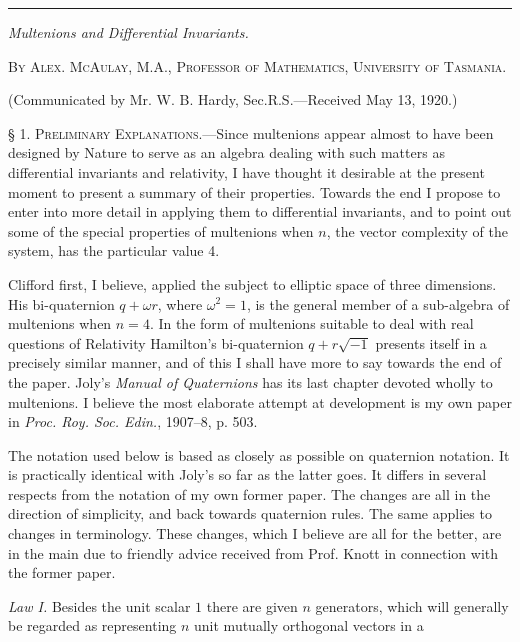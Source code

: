 \documentclass[11pt]{article}
\begin{document}
\thispagestyle{empty}

\begin{center}\rule{0.34\textwidth}{0.5pt}\end{center}
\begin{center}\textit{Multenions and Differential Invariants.}\end{center}
\begin{center}\textsc{By Alex. McAulay, M.A., Professor of Mathematics, University of Tasmania.}\end{center}
\begin{center}(Communicated by Mr. W. B. Hardy, Sec.R.S.---Received May 13, 1920.)\end{center}

\noindent\textsc{§ 1. Preliminary Explanations.}---Since multenions appear almost to have been designed by Nature to serve as an algebra dealing with such matters as differential invariants and relativity, I have thought it desirable at the present moment to present a summary of their properties. Towards the end I propose to enter into more detail in applying them to differential invariants, and to point out some of the special properties of multenions when $n$, the vector complexity of the system, has the particular value 4.

\indent Clifford first, I believe, applied the subject to elliptic space of three dimensions. His bi-quaternion $q+\omega r$, where $\omega^2=1$, is the general member of a sub-algebra of multenions when $n=4$. In the form of multenions suitable to deal with real questions of Relativity Hamilton's bi-quaternion $q+r\sqrt{-1}$ presents itself in a precisely similar manner, and of this I shall have more to say towards the end of the paper. Joly's \emph{Manual of Quaternions} has its last chapter devoted wholly to multenions. I believe the most elaborate attempt at development is my own paper in \emph{Proc. Roy. Soc. Edin.}, 1907--8, p. 503.

\indent The notation used below is based as closely as possible on quaternion notation. It is practically identical with Joly's so far as the latter goes. It differs in several respects from the notation of my own former paper. The changes are all in the direction of simplicity, and back towards quaternion rules. The same applies to changes in terminology. These changes, which I believe are all for the better, are in the main due to friendly advice received from Prof. Knott in connection with the former paper.

\indent \emph{Law I.} Besides the unit scalar $1$ there are given $n$ generators, which will generally be regarded as representing $n$ unit mutually orthogonal vectors in a
\end{document}

